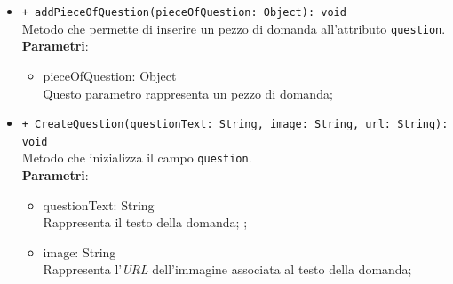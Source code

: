 \begin{itemize}
\begin{itemize}
				\item \texttt{+ addPieceOfQuestion(pieceOfQuestion: Object): void} \\
				Metodo che permette di inserire un pezzo di domanda all'attributo \texttt{question}.\\
				\textbf{Parametri}:
				\begin{itemize}
					\item {pieceOfQuestion: Object}\\
					Questo parametro rappresenta un pezzo di domanda;
				\end{itemize}
				
				\item \texttt{+ CreateQuestion(questionText: String, image: String, url: String): void} \\
				Metodo che inizializza il campo \texttt{question}.\\
				\textbf{Parametri}:
				\begin{itemize}
					\item {questionText: String}\\
					Rappresenta il testo della domanda; ;
					\item {image: String}\\
					Rappresenta l'\textit{URL} dell'immagine associata al testo della domanda; 
				\end{itemize}	
			\end{itemize}
		\end{itemize}
		
		